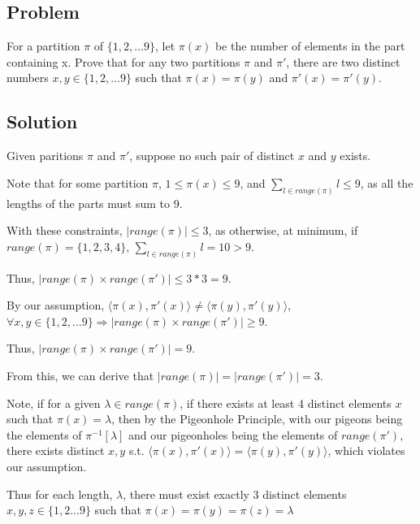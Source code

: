 \documentclass{article}
\newcommand{\pair}[1]{\langle #1 \rangle}
\begin{document}
\begin{center}\item\section*{Problem}\end{center}
For a partition $\pi$ of $\{1,2,...9\}$, let $\pi(x)$ be the number
of elements in the part containing x.
Prove that for any two partitions $\pi$ and $\pi'$, there are two distinct
numbers $x,y \in \{1,2,...9\}$ such that $\pi(x)=\pi(y)$ and
$\pi'(x)=\pi'(y)$.

\begin{center}\item\section*{Solution}\end{center}
Given paritions $\pi$ and $\pi'$, suppose no such pair of distinct $x$ and $y$ exists.

Note that for some partition $\pi$, $1 \leq \pi(x) \leq 9$, and 
$\displaystyle\sum_{l\in range(\pi)} l\leq9$, as all the lengths of the parts must sum to 9.

With these constraints, $|range(\pi)|\leq 3$, as otherwise, at minimum, if 
$range(\pi)=\{1,2,3,4\}$, $\displaystyle\sum_{l\in range(\pi)} l=10 > 9$.

Thus, $|range(\pi) \times range(\pi')|\leq 3*3=9$.

By our assumption, $\pair{\pi(x),\pi'(x)} \not= \pair{\pi(y),\pi'(y)}$,
$\forall x,y \in \{1,2,...9\} \Rightarrow 
|range(\pi) \times range(\pi')|\geq 9$.

Thus, $|range(\pi)\times range(\pi')|=9$.

From this, we can derive that $|range(\pi)|=|range(\pi')|=3$.

Note, if for a given $\lambda \in range(\pi)$, if there exists at least 4
distinct elements $x$ such that $\pi(x)=\lambda$, then by the 
Pigeonhole Principle, with our pigeons being the elements of 
$\pi^{-1}[\lambda]$ and our pigeonholes being the elements of $range(\pi')$, there exists distinct $x,y$ s.t. 
$\pair{\pi(x),\pi'(x)}=\pair{\pi(y),\pi'(y)}$, which violates our assumption.

Thus for each length, $\lambda$, there must exist exactly 3 distinct
elements $x,y,z \in \{1,2...9\}$ such that $\pi(x)=\pi(y)=\pi(z)=\lambda$
\end{document}
